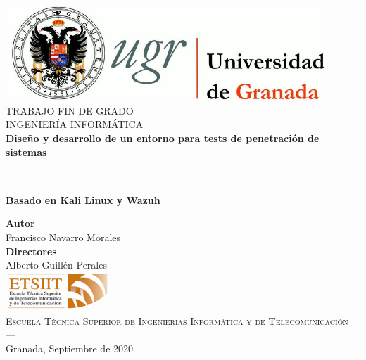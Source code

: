 \begin{titlepage}
 
 
\newlength{\centeroffset}
\setlength{\centeroffset}{-0.5\oddsidemargin}
\addtolength{\centeroffset}{0.5\evensidemargin}
\thispagestyle{empty}

\noindent\hspace*{\centeroffset}\begin{minipage}{\textwidth}

\centering
\includegraphics[width=0.9\textwidth]{imagenes/logo_ugr.jpg}\\[1.4cm]

\textsc{ \Large TRABAJO FIN DE GRADO\\[0.2cm]}
\textsc{ INGENIERÍA INFORMÁTICA}\\[1cm]
% 
{\Huge\bfseries Diseño y desarrollo de un entorno para tests de penetración de sistemas \\
}
\noindent\rule[-1ex]{\textwidth}{3pt}\\[3.5ex]
{\large\bfseries Basado en Kali Linux y Wazuh}
\end{minipage}

\vspace{2.5cm}
\noindent\hspace*{\centeroffset}\begin{minipage}{\textwidth}
\centering

\textbf{Autor}\\ {Francisco Navarro Morales}\\[2.5ex]
\textbf{Directores}\\
{Alberto Guillén Perales\\}
\includegraphics[width=0.3\textwidth]{imagenes/etsiit_logo.png}\\[0.1cm]
\textsc{Escuela Técnica Superior de Ingenierías Informática y de Telecomunicación}\\
\textsc{---}\\
Granada, Septiembre de 2020
\end{minipage}
\end{titlepage}


